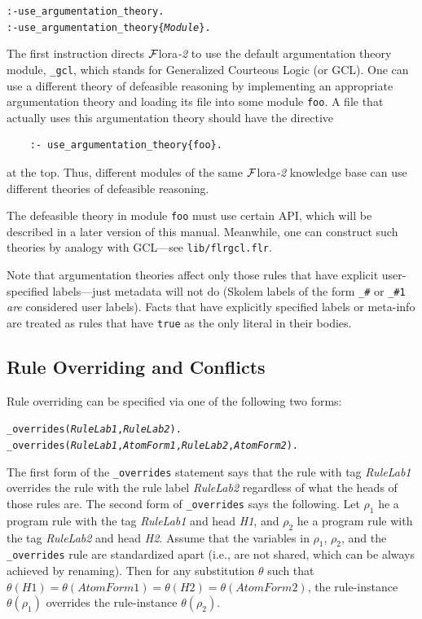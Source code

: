 \documentclass[11pt]{article}
\newcommand{\FLORA}{{\mbox{\sc ${\cal F}${lora}\rm\emph{-2}}}\xspace}
\begin{document}
\begin{alltt}
  :- use_argumentation_theory.
  :- use_argumentation_theory\{\emph{Module}\}.
\end{alltt}
The first instruction directs \FLORA to use the default argumentation theory
module, {\tt \_gcl}, which stands for Generalized Courteous Logic (or GCL).
One can use a different theory of defeasible reasoning by implementing an
appropriate argumentation theory and
loading its file into some module {\tt foo}.
A file that actually uses this argumentation theory should have
the directive
\begin{verbatim}
    :- use_argumentation_theory{foo}.
\end{verbatim}
at the top. Thus, different modules of the same \FLORA
knowledge base can use different theories of defeasible reasoning.

The defeasible theory in module {\tt foo} must use certain API, which will
be described in a later version of this manual. Meanwhile, one can
construct such theories by analogy with GCL---see {\tt lib/flrgcl.flr}.  

Note that argumentation theories affect only those rules that have explicit
user-specified labels---just metadata will not do (Skolem labels of the
form {\tt \_\#} or {\tt \_\#1} \emph{are} considered user labels). Facts
that have explicitly specified labels or meta-info are treated as rules
that have {\tt true} as the only literal in their bodies.

\subsection{Rule Overriding and Conflicts}\label{sec-overriding-conflict}

Rule overriding can be specified via one of the following two forms:
\begin{alltt}
  _overrides({\em{}RuleLab1},\emph{RuleLab2}).
  _overrides({\em{}RuleLab1},{\em{}AtomForm1},{\em{}RuleLab2},\emph{AtomForm2}).
\end{alltt}
The first form of the {\tt \_overrides} statement says that the rule with
tag \emph{RuleLab1} overrides the rule with the rule label
\emph{RuleLab2} regardless of what the heads of those rules are. The second
form of {\tt \_overrides} says the following. Let $\rho_1$ he a program
rule with the tag \emph{RuleLab1} and head \emph{H1}, and $\rho_2$ he a
program rule with the tag \emph{RuleLab2} and head \emph{H2}. Assume that
the variables in $\rho_1$, $\rho_2$, and the {\tt \_overrides} rule are
standardized apart (i.e., are not shared, which can be always achieved by
renaming).   Then for any substitution $\theta$ such that $\theta(H1) =
\theta(AtomForm1) = \theta(H2) = \theta(AtomForm2)$, the rule-instance
$\theta(\rho_1)$ overrides the rule-instance $\theta(\rho_2)$.
\end{document}
